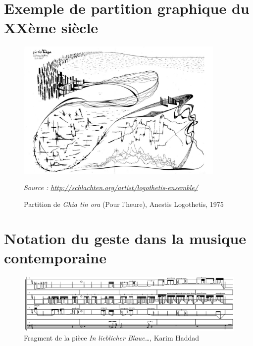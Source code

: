 \section{Exemple de partition graphique du XXème siècle}
\label{sec:exempleAnestisLogothetis}
\begin{figure}[H]
	\centering
	\includegraphics[keepaspectratio=true, width=0.9\textwidth]{Annexes/i/exempleAnestisLogothetis.jpg}
	\caption{Partition de \textit{Ghia tin ora} (Pour l'heure), Anestis Logothetis, 1975}
	\medskip
	\small
	\textit{Source : \url{http://schlachten.org/artist/logothetis-ensemble/}} 	
	\label{fig:exempleAnestisLogothetis}
\end{figure}
\clearpage

\section{Notation du geste dans la musique contemporaine}
\label{sec:exempleKarimHaddad}
\begin{figure}[H]
	\centering
	\includegraphics[keepaspectratio=true, width=\textwidth]{Annexes/i/exempleKarimHaddad.png}
	\caption{Fragment de la pièce \textit{In lieblicher Blaue…}, Karim Haddad}
	\medskip
	\small
	\label{fig:exempleKarimHaddad}
\end{figure}
\clearpage

